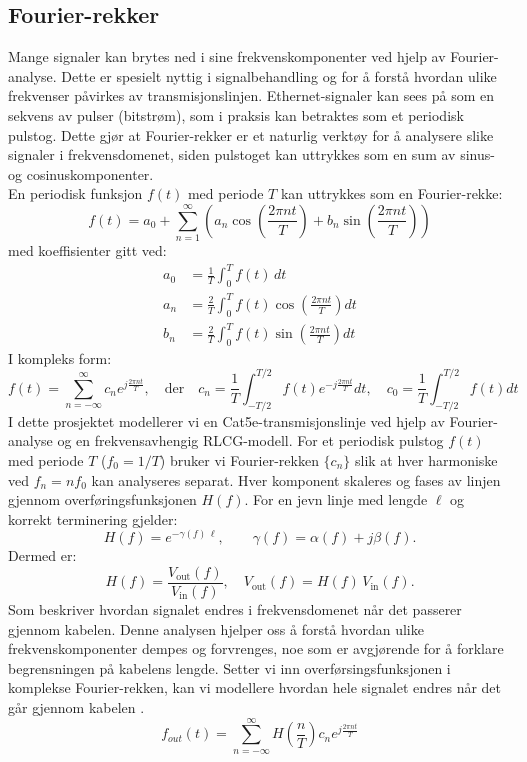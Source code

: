 \subsection{Fourier-rekker}

Mange signaler kan brytes ned i sine frekvenskomponenter ved hjelp av Fourier-analyse. Dette er spesielt nyttig i signalbehandling og for å forstå hvordan ulike frekvenser påvirkes av transmisjonslinjen. Ethernet-signaler kan sees på som en sekvens av pulser (bitstrøm), som i praksis kan betraktes som et periodisk pulstog. Dette gjør at Fourier-rekker er et naturlig verktøy for å analysere slike signaler i frekvensdomenet, siden pulstoget kan uttrykkes som en sum av sinus- og cosinuskomponenter.\\[1em]
En periodisk funksjon $f(t)$ med periode $T$ kan uttrykkes som en Fourier-rekke:
\begin{equation}
f(t) = a_0 + \sum_{n=1}^{\infty} \left( a_n \cos\left(\frac{2\pi n t}{T}\right) + b_n \sin\left(\frac{2\pi n t}{T}\right) \right)
\end{equation}
med koeffisienter gitt ved:
\begin{align*}
a_0 &= \frac{1}{T} \int_{0}^{T} f(t) \, dt \\
a_n &= \frac{2}{T} \int_{0}^{T} f(t) \cos\left(\frac{2\pi n t}{T}\right) dt \\
b_n &= \frac{2}{T} \int_{0}^{T} f(t) \sin\left(\frac{2\pi n t}{T}\right) dt
\end{align*}
I kompleks form:
\begin{equation}
f(t) = \sum_{n=-\infty}^{\infty} c_n e^{j \frac{2\pi n t}{T}}, \quad \text{der} \quad c_n = \frac{1}{T} \int_{-T/2}^{T/2} f(t) e^{-j \frac{2\pi n t}{T}} dt, \quad c_0 = \frac{1}{T} \int_{-T/2}^{T/2} f(t) dt
\end{equation}
I dette prosjektet modellerer vi en Cat5e-transmisjonslinje ved hjelp av Fourier-analyse
og en frekvensavhengig RLCG-modell. For et periodisk pulstog \(f(t)\) med periode \(T\)
(\(f_0=1/T\)) bruker vi Fourier-rekken \(\{c_n\}\) slik at hver harmoniske ved
\(f_n=nf_0\) kan analyseres separat. Hver komponent skaleres og fases av linjen gjennom
overføringsfunksjonen \(H(f)\). For en jevn linje med lengde \(\ell\) og korrekt terminering
gjelder:
\[
H(f)=e^{-\gamma(f)\,\ell},\qquad \gamma(f)=\alpha(f)+j\beta(f).
\]
Dermed er:
\[
H(f)=\frac{V_{\text{out}}(f)}{V_{\text{in}}(f)},\quad
V_{\text{out}}(f)=H(f)\,V_{\text{in}}(f).
\]
Som beskriver hvordan signalet endres i frekvensdomenet når det passerer gjennom kabelen.
Denne analysen hjelper oss å forstå hvordan ulike frekvenskomponenter dempes og forvrenges, noe som er avgjørende for å forklare begrensningen på kabelens lengde.
Setter vi inn overførsingsfunksjonen i komplekse Fourier-rekken, kan vi modellere hvordan hele signalet endres når det går gjennom kabelen \cite{engineering_mathematics}.
\begin{equation}
    f_{out}(t) = \sum_{n=-\infty}^{\infty} H\left(\frac{n}{T}\right) c_n e^{j \frac{2\pi n t}{T}}
\end{equation}
